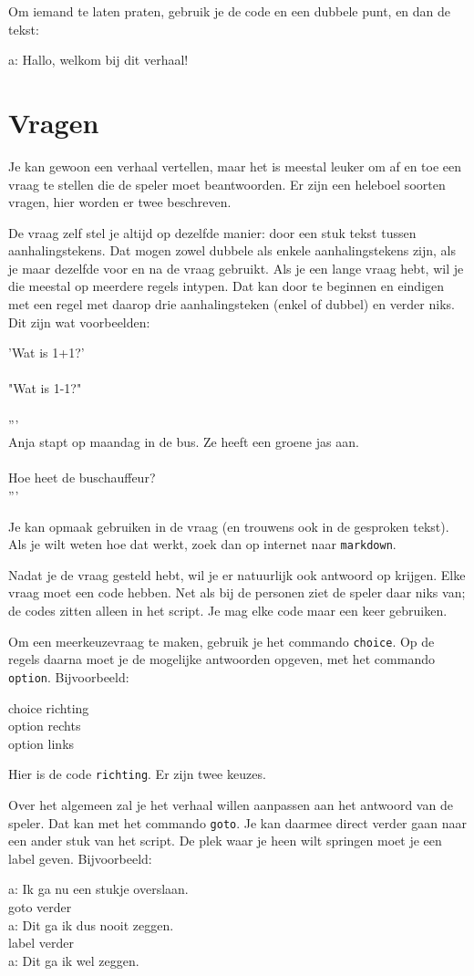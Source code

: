 \documentclass{article}
\newcommand\code[1]{\par\noindent\begin{texttt}#1\end{texttt}\par}
\begin{document}
\noindent Om iemand te laten praten, gebruik je de code en een dubbele punt, en
dan de tekst:
\code{a: Hallo, welkom bij dit verhaal!}

\section{Vragen}
Je kan gewoon een verhaal vertellen, maar het is meestal leuker om af en toe
een vraag te stellen die de speler moet beantwoorden. Er zijn een heleboel
soorten vragen, hier worden er twee beschreven.

De vraag zelf stel je altijd op dezelfde manier: door een stuk tekst tussen
aanhalingstekens. Dat mogen zowel dubbele als enkele aanhalingstekens zijn, als
je maar dezelfde voor en na de vraag gebruikt. Als je een lange vraag hebt, wil
je die meestal op meerdere regels intypen. Dat kan door te beginnen en eindigen
met een regel met daarop drie aanhalingsteken (enkel of dubbel) en verder niks.
Dit zijn wat voorbeelden:
\code{'Wat is 1+1?'\\
\\
"Wat is 1-1?"\\
\\
'''\\
Anja stapt op maandag in de bus. Ze heeft een groene jas aan.\\
\\
Hoe heet de buschauffeur?\\
'''}

Je kan opmaak gebruiken in de vraag (en trouwens ook in de gesproken tekst).
Als je wilt weten hoe dat werkt, zoek dan op internet naar \verb-markdown-.

Nadat je de vraag gesteld hebt, wil je er natuurlijk ook antwoord op krijgen.
Elke vraag moet een code hebben. Net als bij de personen ziet de speler daar
niks van; de codes zitten alleen in het script. Je mag elke code maar een keer
gebruiken.

Om een meerkeuzevraag te maken, gebruik je het commando \verb-choice-. Op de
regels daarna moet je de mogelijke antwoorden opgeven, met het commando
\verb-option-. Bijvoorbeeld:
\code{choice richting\\
option rechts\\
option links}

Hier is de code \verb-richting-. Er zijn twee keuzes.

Over het algemeen zal je het verhaal willen aanpassen aan het antwoord van de
speler. Dat kan met het commando \verb-goto-. Je kan daarmee direct verder gaan
naar een ander stuk van het script. De plek waar je heen wilt springen moet je
een label geven. Bijvoorbeeld:
\code{a: Ik ga nu een stukje overslaan.\\
goto verder\\
a: Dit ga ik dus nooit zeggen.\\
label verder\\
a: Dit ga ik wel zeggen.}
\end{document}
